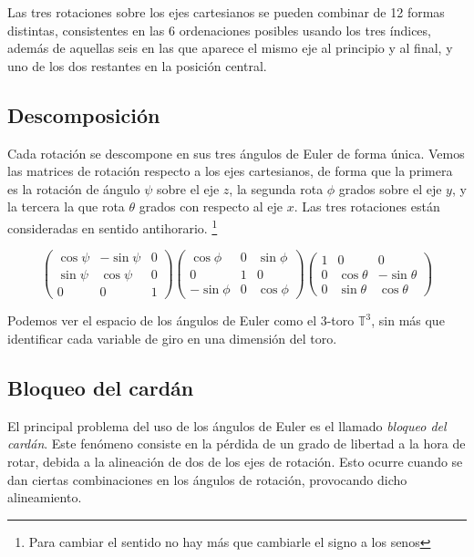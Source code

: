 \documentclass{article}
\theoremstyle{plain}
\theoremstyle{definition}
\theoremstyle{remark}
\begin{document}
Las tres rotaciones sobre los ejes cartesianos se pueden combinar de
12 formas distintas, consistentes en las 6 ordenaciones posibles
usando los tres índices, además de aquellas seis en las que aparece el
mismo eje al principio y al final, y uno de los dos restantes en la
posición central.


\subsection{Descomposición}
Cada rotación se descompone en sus tres ángulos de Euler de forma
única. Vemos las matrices de rotación respecto a los ejes cartesianos,
de forma que la primera es la rotación de ángulo $\psi$ sobre el eje
$z$, la segunda rota $\phi$ grados sobre el eje $y$, y la tercera la
que rota $\theta$ grados con respecto al eje $x$. Las tres rotaciones
están consideradas en sentido antihorario.
\footnote{Para cambiar el sentido no hay más que cambiarle el signo a los senos}

\[\begin{pmatrix}
    \cos \psi & -\sin \psi & 0 \\
    \sin \psi & \cos \psi & 0 \\
    0 & 0 & 1
  \end{pmatrix}\begin{pmatrix}
      \cos \phi & 0 & \sin \phi \\
      0 & 1 & 0 \\
      -\sin \phi & 0 & \cos \phi
    \end{pmatrix}\begin{pmatrix}
    1 & 0 & 0 \\
    0 & \cos \theta & -\sin \theta \\
    0 & \sin \theta & \cos \theta
  \end{pmatrix}
\]

Podemos ver el espacio de los ángulos de Euler como el 3-toro
$\mathbb T^3$, sin más que identificar cada variable de giro en una
dimensión del toro.


\subsection{Bloqueo del cardán}

El principal problema del uso de los ángulos de Euler es el llamado
\textit{bloqueo del cardán}. Este fenómeno consiste en la pérdida de
un grado de libertad a la hora de rotar, debida a la alineación de dos
de los ejes de rotación. Esto ocurre cuando se dan ciertas
combinaciones en los ángulos de rotación, provocando dicho
alineamiento.
\end{document}
